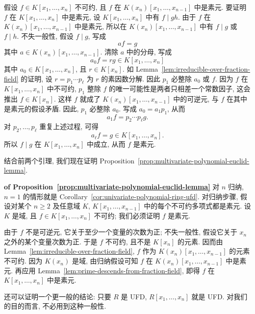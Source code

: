 \begin{Proof}
  假设 $f\in K[x_{1},\ldots,x_{n}]$ 不可约, 且 $f$ 在 $K(x_{n})[x_{1},\ldots,x_{n-1}]$ 中是素元. 要证明 $f$ 在 $K[x_{1},\ldots,x_{n}]$ 中是素元, 设 $K[x_{1},\ldots,x_{n}]$ 中有 $f\mid gh$. 由于 $f$ 在 $K(x_{n})[x_{1},\ldots,x_{n-1}]$ 中是素元, 所以在 $K(x_{n})[x_{1},\ldots,x_{n-1}]$ 中有 $f\mid g$ 或 $f\mid h$. 不失一般性, 假设 $f\mid g$, 写成
  \[
    af=g
  \]
  其中 $a\in K(x_{n})[x_{1},\ldots,x_{n-1}]$. 清除 $a$ 中的分母, 写成
  \[
    a_{0}f=rg\in K[x_{1},\ldots,x_{n}]
  \]
  其中 $a_{0}\in K[x_{1},\ldots,x_{n}]$, 且 $r\in K[x_{n}]$. 如 Lemma~\ref{lem:irreducible-over-fraction-field} 的证明, 设 $r=p_{1}\cdots p_{\ell}$ 为 $r$ 的素因数分解. 因此 $p_{1}$ 必整除 $a_{0}$ 或 $f$. 因为 $f$ 在 $K[x_{1},\ldots,x_{n}]$ 中不可约, $p_{1}$ 整除 $f$ 的唯一可能性是两者只相差一个常数因子, 这会推出 $f\in K[x_{n}]$. 这样 $f$ 就成了 $K(x_{n})[x_{1},\ldots,x_{n-1}]$ 中的可逆元, 与 $f$ 在其中是素元的假设矛盾. 因此, $p_{1}$ 必整除 $a_{0}$. 写成 $a_{0}=a_{1}p_{1}$, 从而
  \[
    a_{1}f=p_{2}\cdots p_{\ell}g.
  \]
  对 $p_{2},\ldots,p_{\ell}$ 重复上述过程, 可得
  \[
    a_{\ell}f=g\in K[x_{1},\ldots,x_{n}].
  \]
  所以 $f\mid g$ 在 $K[x_{1},\ldots,x_{n}]$ 中成立, 从而 $f$ 是素元.
\end{Proof}

结合前两个引理, 我们现在证明 Proposition~\ref{prop:multivariate-polynomial-euclid-lemma}.

\begin{Proof}\unskip\textbf{ of Proposition~\ref{prop:multivariate-polynomial-euclid-lemma}}\quad
  对 $n$ 归纳, $n=1$ 的情形就是 Corollary~\ref{cor:univariate-polynomial-ring-ufd}. 对归纳步骤, 假设对某个 $n\ge2$ 及任意域 $K$, $K[x_{1},\ldots,x_{n-1}]$ 中的每个不可约多项式都是素元. 设 $K$ 是域, 且 $f\in K[x_{1},\ldots,x_{n}]$ 不可约; 我们必须证明 $f$ 是素元.

  由于 $f$ 不是可逆元, 它关于至少一个变量的次数为正; 不失一般性, 假设它关于 $x_{n}$ 之外的某个变量次数为正. 于是 $f$ 不可约, 且不是 $K[x_{n}]$ 的元素. 因而由 Lemma~\ref{lem:irreducible-over-fraction-field}, $f$ 作为 $K(x_{n})[x_{1},\ldots,x_{n-1}]$ 的元素不可约. 因为 $K(x_{n})$ 是域, 由归纳假设可知 $f$ 在 $K(x_{n})[x_{1},\ldots,x_{n-1}]$ 中是素元. 再应用 Lemma~\ref{lem:prime-descends-from-fraction-field}, 即得 $f$ 在 $K[x_{1},\ldots,x_{n}]$ 中是素元.
\end{Proof}

%
  {还可以证明一个更一般的结论: 只要 $R$ 是 UFD, $R[x_{1},\ldots,x_{n}]$ 就是 UFD. 对我们的目的而言, 不必用到这种一般性.}

